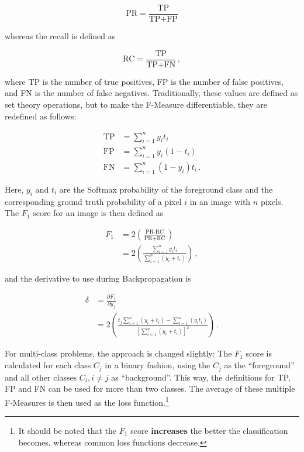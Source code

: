 \[ \text{PR} = \frac{\text{TP}}{\text{TP} + \text{FP}} \]

\noindent whereas the recall is defined as

\[ \text{RC} = \frac{\text{TP}}{\text{TP} + \text{FN}} \,, \]

\noindent where TP is the number of true positives, FP is the number of false positives, and FN is the number of false negatives. Traditionally, these values are defined as set theory operations, but to make the F-Measure differentiable, they are redefined as follows:

\begin {align}
\text{TP} &= \sum \limits_{i=1}^{n} y_i t_i \\
\text{FP} &= \sum  \limits_{i=1}^{n} y_i (1 - t_i) \\
\text{FN} &= \sum \limits_{i=1}^{n} (1 - y_i) t_i \,.
\end {align}

\noindent Here, $y_i$ and $t_i$ are the Softmax probability of the foreground class and the corresponding ground truth probability of a pixel $i$ in an image with $n$ pixels. The $F_1$ score for an image is then defined as

\begin {align}
 	F_1 &= 2 \left ( \frac{\text{PR} \cdot \text{RC}}{\text{PR} + \text{RC}} \right ) \\
		&= 2 \left ( \frac{\sum_{i=1}^{n} y_i t_i }{ \sum_{i=1}^{n} (y_i + t_i) } \right ) \,,
\end {align}

\noindent and the derivative to use during Backpropagation is

\begin {align}
	\delta &= \frac{\partial F_1}{\partial y_j}\\
	&= 2 \left ( \frac{t_j \sum_{i=1}^{n} \left ( y_i + t_i \right ) - \sum_{i=1}^{n} \left ( y_i t_i \right )  }{\left [ \sum_{i=1}^{n} \left ( y_i + t_i \right ) \right ]^2 } \right ) \,.
\end {align}

\noindent For multi-class problems, the approach is changed slightly: The $F_1$ score is calculated for each class $C_j$ in a binary fashion, using the $C_j$ as the ``foreground'' and all other classes $C_i, i \neq j$ as ``background''. This way, the definitions for TP, FP and FN can be used for more than two classes. The average of these multiple F-Measures is then used as the loss function.\footnote{It should be noted that the $F_1$ score \textbf{increases} the better the classification becomes, whereas common loss functions decrease.}

